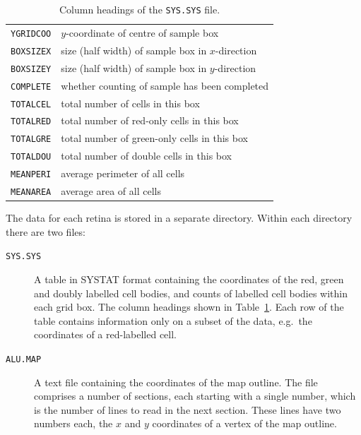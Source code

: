 \documentclass{book}
\begin{document}
\begin{table}
\begin{tabular}{ll}
    \texttt{YGRIDCOO} & $y$-coordinate of centre of sample box \\
    \texttt{BOXSIZEX} & size (half width) of sample box in $x$-direction \\
    \texttt{BOXSIZEY} & size (half width) of sample box in $y$-direction \\
    \texttt{COMPLETE} & whether counting of sample has been completed\\
    \texttt{TOTALCEL} & total number of cells in this box\\
    \texttt{TOTALRED} & total number of red-only cells in this box\\
    \texttt{TOTALGRE} & total number of green-only cells in this box\\
    \texttt{TOTALDOU} & total number of double cells in this box\\
    \texttt{MEANPERI} & average perimeter of all cells \\
    \texttt{MEANAREA} & average area of all cells \\
  \end{tabular}
  \caption{Column headings of the \texttt{SYS.SYS} file.}
  \label{tab:data-format}
\end{table}

The data for each retina is stored in a separate directory. Within
each directory there are two files:
\begin{description}
\item[\texttt{SYS.SYS}] A table in SYSTAT format containing the
  coordinates of the red, green and doubly labelled cell bodies, and
  counts of labelled cell bodies within each grid box. The column
  headings shown in Table~\ref{tab:data-format}.  Each row of the
  table contains information only on a subset of the data, e.g.\ the
  coordinates of a red-labelled cell.
\item[\texttt{ALU.MAP}] A text file containing the coordinates of the
  map outline. The file comprises a number of sections, each starting
  with a single number, which is the number of lines to read in the
  next section. These lines have two numbers each, the $x$ and $y$
  coordinates of a vertex of the map outline.
\end{description}

\end{document}

